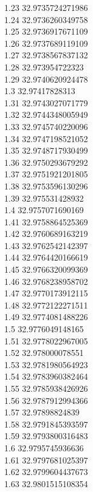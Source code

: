 {1.23	32.9735724271986\\
1.24	32.9736260349758\\
1.25	32.9736917671109\\
1.26	32.9737689119109\\
1.27	32.9738567837132\\
1.28	32.973954722323\\
1.29	32.9740620924478\\
1.3	32.97417828313\\
1.31	32.9743027071779\\
1.32	32.9744348005949\\
1.33	32.9745740220096\\
1.34	32.9747198521052\\
1.35	32.9748717930499\\
1.36	32.9750293679292\\
1.37	32.9751921201805\\
1.38	32.9753596130296\\
1.39	32.975531428932\\
1.4	32.9757071690169\\
1.41	32.9758864525369\\
1.42	32.9760689163219\\
1.43	32.9762542142397\\
1.44	32.9764420166619\\
1.45	32.9766320099369\\
1.46	32.9768238958702\\
1.47	32.9770173912115\\
1.48	32.9772122271511\\
1.49	32.9774081488226\\
1.5	32.9776049148165\\
1.51	32.9778022967005\\
1.52	32.978000078551\\
1.53	32.9781980564923\\
1.54	32.9783960382464\\
1.55	32.9785938426926\\
1.56	32.9787912994366\\
1.57	32.97898824839\\
1.58	32.9791845393597\\
1.59	32.9793800316483\\
1.6	32.9795745936636\\
1.61	32.9797681025397\\
1.62	32.9799604437673\\
1.63	32.9801515108354\\
}
